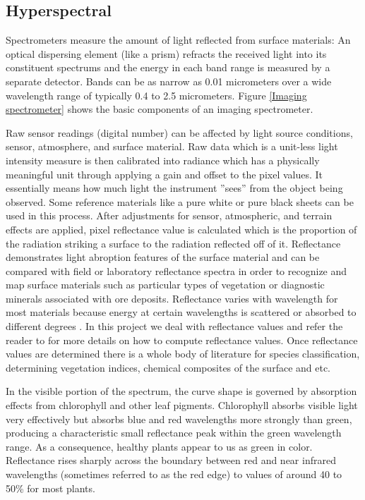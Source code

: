 \subsection{Hyperspectral}

Spectrometers measure the amount of light reflected from surface materials: An optical dispersing element (like a prism) refracts the received light into its constituent spectrums and the energy in each band range is measured by a separate detector. Bands can be as narrow as 0.01 micrometers over a wide wavelength range of typically 0.4 to 2.5 micrometers. Figure \ref{Imaging spectrometer} shows the basic components of an imaging spectrometer.

Raw sensor readings (digital number) can be affected by light source conditions, sensor, atmosphere, and surface material. Raw data which is a unit-less light intensity measure is then calibrated into radiance which has a  physically meaningful unit through applying a gain and offset to the pixel values. It essentially means how much light the instrument ''sees'' from the object being observed. Some reference materials like a pure white or pure black sheets can be used in this process. After adjustments for sensor, atmospheric, and terrain effects are applied, pixel reflectance value is calculated which is the proportion of the radiation striking a surface to the radiation reflected off of it. Reflectance demonstrates light abroption features of the surface material and can be compared with field or laboratory reflectance spectra in order to recognize and map surface materials such as particular types of vegetation or diagnostic minerals associated with ore deposits. Reflectance varies with wavelength for most materials because energy at certain wavelengths is scattered or absorbed to different degrees \citep{smith2006introduction}. In this project we deal with reflectance values and refer the reader to \citep{varshney2004advanced} for more details on how to compute reflectance values. Once reflectance values are determined there is a whole body of literature for species classification, determining vegetation indices, chemical composites of the surface and etc. 





In the visible portion of the spectrum, the curve shape is governed by absorption effects from chlorophyll and other leaf pigments. Chlorophyll absorbs visible light very effectively but absorbs blue and red wavelengths more strongly than green, producing a characteristic small reflectance peak within the green wavelength range. As a consequence, healthy plants appear to us as green in color. Reflectance rises sharply across the boundary between red and near infrared wavelengths (sometimes referred to as the red edge) to values of around 40 to 50\% for most plants.

